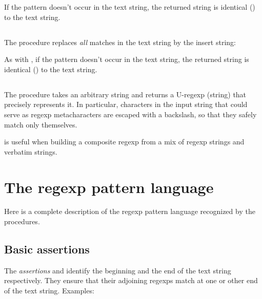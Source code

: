 {

\n If the pattern doesn't occur in the text
string, the returned string is identical ()
to the text string.

\subsection{}

The procedure  replaces
{\em all}
matches in the text string by the insert
string:


\n As with , if the pattern doesn't
occur in the text string, the returned string is
identical () to the text string.

\subsection{}

The procedure  takes
an arbitrary string and returns a U-regexp
(string) that precisely represents it.  In particular,
characters in the input string that could serve as
regexp metacharacters are escaped with a
backslash, so that they safely match only themselves.


 is useful when building a composite
regexp from a mix of regexp strings and verbatim strings.

\section{The regexp pattern language}

Here is a complete description of the regexp pattern
language recognized by the  procedures.

\subsection{Basic assertions}

The {\em assertions} \p{^} and \p{$} identify the
beginning and the end of the text string respectively.
They ensure that their adjoining regexps match at
one or other end of the text string.
Examples:

}
